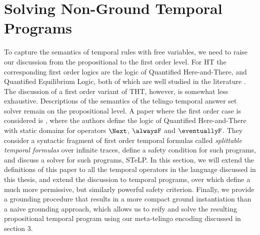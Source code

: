 \section{Solving Non-Ground Temporal Programs}

To capture the semantics of temporal rules with free variables, we
need to raise our discussion from the propositional to the first order
level. For HT the corresponding first order logics are the logic of
Quantified Here-and-There, and Quantified Equilibrium Logic, both of
which are well studied in the literature \cite{peaval06a}
\cite{peaval08a}. The discussion of a first order variant of THT,
however, is somewhat less exhaustive. Descriptions of the semantics of
the telingo temporal answer set solver remain on the propositional
level. A paper where the first order case is considered is
\cite{agcapevidi17a}, where the authors define the logic of Quantified
Here-and-There with static domains for operators $\Next$, $\alwaysF$
and $\eventuallyF$. They consider a syntactic fragment of first order
temporal formulas called \emph{splittable temporal formulas} over
infinite traces, define a safety condition for such programs, and
discuss a solver for such programs, STeLP. In this section, we will
extend the definitions of this paper to all the temporal operators in
the language discussed in this thesis, and extend the discussion to
temporal programs, over which define a much more permissive, but
similarly powerful safety criterion. Finally, we provide a grounding
procedure that results in a more compact ground instantiation than a
naive grounding approach, which allows us to reify and solve the
resulting propositional temporal program using our meta-telingo
encoding discussed in section 3.




